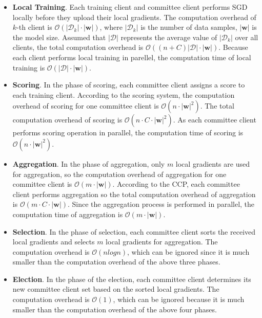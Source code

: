 \documentclass[10pt,journal,compsoc]{IEEEtran}
\newcommand{\w}{\mathbf{w}}
\newcommand{\D}{\mathcal{D}}
\begin{document}
\begin{itemize}
  \item \textbf{Local Training}. Each training client and committee client performs SGD locally before they upload their local gradients. The computation overhead of $k$-th client is $\mathcal{O}(|\D_k|\cdot|\w|)$, where $|\D_k|$ is the number of data samples, $|\w|$ is the model size. Assumed that $|\D|$ represents the average value of $|\D_k|$ over all clients, the total computation overhead is {$\mathcal{O}((n + C)|\D|\cdot|\w|)$}. Because each client performs local training in parellel, the computation time of local training is $\mathcal{O}(|\D|\cdot|\w|)$. 
  \item \textbf{Scoring}. In the phase of scoring, each committee client assigns a score to each training client. According to the scoring system, the computation overhead of scoring for one committee client is {$\mathcal{O}(n \cdot |\w|^2)$}. The total computation overhead of scoring is {$\mathcal{O}(n\cdot C \cdot |\w|^2)$}. As each committee client performs scoring operation in parallel, the computation time of scoring is {$\mathcal{O}(n \cdot |\w|^2)$}. 
  \item \textbf{Aggregation}. In the phase of aggregation, only $m$ local gradients are used for aggregation, so the computation overhead of aggregation for one committee client is $\mathcal{O}(m\cdot |\w|)$. According to the CCP, each committee client performs aggregation so the total computation overhead of aggregation is {$\mathcal{O}(m\cdot C\cdot|\w|)$}. Since the aggregation process is performed in parallel, the computation time of aggregation is $\mathcal{O}(m\cdot |\w|)$. 
  \item \textbf{Selection}. In the phase of selection, each committee client sorts the received local gradients and selects $m$ local gradients for aggregation. The computation overhead is {$\mathcal{O}(nlogn)$}, which can be ignored since it is much smaller than the computation overhead of the above three phases. 
  \item \textbf{Election}. In the phase of the election, each committee client determines its new committee client set based on the sorted local gradients. The computation overhead is $\mathcal{O}(1)$, which can be ignored because it is much smaller than the computation overhead of the above four phases. 
\end{itemize}
\end{document}
